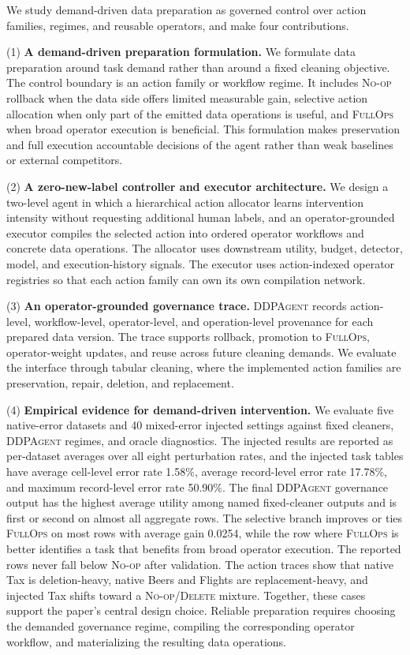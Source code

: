 \documentclass[sigconf, nonacm]{acmart}
\newcommand{\sys}{\textsc{DDPAgent}\xspace}
\newcommand{\noop}{\textsc{No-op}\xspace}
\newcommand{\deleteop}{\textsc{Delete}\xspace}
\newcommand{\fullops}{\textsc{FullOps}\xspace}
\begin{document}
We study demand-driven data preparation as governed control over action families, regimes, and reusable operators, and make four contributions.

(1) \textbf{A demand-driven preparation formulation.} We formulate data preparation around task demand rather than around a fixed cleaning objective. The control boundary is an action family or workflow regime. It includes \noop rollback when the data side offers limited measurable gain, selective action allocation when only part of the emitted data operations is useful, and \fullops when broad operator execution is beneficial. This formulation makes preservation and full execution accountable decisions of the agent rather than weak baselines or external competitors.

(2) \textbf{A zero-new-label controller and executor architecture.} We design a two-level agent in which a hierarchical action allocator learns intervention intensity without requesting additional human labels, and an operator-grounded executor compiles the selected action into ordered operator workflows and concrete data operations. The allocator uses downstream utility, budget, detector, model, and execution-history signals. The executor uses action-indexed operator registries so that each action family can own its own compilation network.

(3) \textbf{An operator-grounded governance trace.} \sys records action-level, workflow-level, operator-level, and operation-level provenance for each prepared data version. The trace supports rollback, promotion to \fullops, operator-weight updates, and reuse across future cleaning demands. We evaluate the interface through tabular cleaning, where the implemented action families are preservation, repair, deletion, and replacement.

(4) \textbf{Empirical evidence for demand-driven intervention.} We evaluate five native-error datasets and 40 mixed-error injected settings against fixed cleaners, \sys regimes, and oracle diagnostics. The injected results are reported as per-dataset averages over all eight perturbation rates, and the injected task tables have average cell-level error rate 1.58\%, average record-level error rate 17.78\%, and maximum record-level error rate 50.90\%. The final \sys governance output has the highest average utility among named fixed-cleaner outputs and is first or second on almost all aggregate rows. The selective branch improves or ties \fullops on most rows with average gain 0.0254, while the row where \fullops is better identifies a task that benefits from broad operator execution. The reported rows never fall below \noop after validation. The action traces show that native Tax is deletion-heavy, native Beers and Flights are replacement-heavy, and injected Tax shifts toward a \noop/\deleteop mixture. Together, these cases support the paper's central design choice. Reliable preparation requires choosing the demanded governance regime, compiling the corresponding operator workflow, and materializing the resulting data operations.
\end{document}
